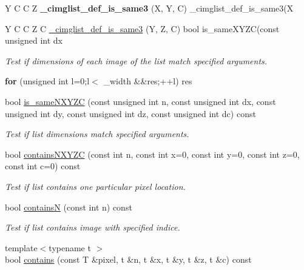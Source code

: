 \begin{DoxyCompactItemize}
Y C C Z {\bfseries \+\_\+cimglist\+\_\+def\+\_\+is\+\_\+same3} (X, Y, C) \+\_\+cimglist\+\_\+def\+\_\+is\+\_\+same3(X
\item 
Y C C Z C \hyperlink{structcimg__library__suffixed_1_1CImgList_af0433cdef08d554b33c9a541cebd8593}{\+\_\+cimglist\+\_\+def\+\_\+is\+\_\+same3} (Y, Z, C) bool is\+\_\+same\+X\+Y\+ZC(const unsigned int dx
\begin{DoxyCompactList}\small\item\em Test if dimensions of each image of the list match specified arguments. \end{DoxyCompactList}\item 
\mbox{\label{structcimg__library__suffixed_1_1CImgList_a2cbfeb29ed7f55c684d5a08d1098f417}} 
{\bfseries for} (unsigned int l=0;l$<$ \+\_\+width \&\&res;++l) res
\item 
bool \hyperlink{structcimg__library__suffixed_1_1CImgList_a3703de66442f8e8ccfc83962e0e09d00}{is\+\_\+same\+N\+X\+Y\+ZC} (const unsigned int n, const unsigned int dx, const unsigned int dy, const unsigned int dz, const unsigned int dc) const
\begin{DoxyCompactList}\small\item\em Test if list dimensions match specified arguments. \end{DoxyCompactList}\item 
bool \hyperlink{structcimg__library__suffixed_1_1CImgList_ad2488203cbf2fddba82666454ea7c90b}{contains\+N\+X\+Y\+ZC} (const int n, const int x=0, const int y=0, const int z=0, const int c=0) const
\begin{DoxyCompactList}\small\item\em Test if list contains one particular pixel location. \end{DoxyCompactList}\item 
bool \hyperlink{structcimg__library__suffixed_1_1CImgList_a717c63e31009dea3c28a2f905434bf1e}{containsN} (const int n) const
\begin{DoxyCompactList}\small\item\em Test if list contains image with specified indice. \end{DoxyCompactList}\item 
{\footnotesize template$<$typename t $>$ }\\bool \hyperlink{structcimg__library__suffixed_1_1CImgList_ab8eb768b6d541a9daff4fee1c6eac8f1}{contains} (const T \&pixel, t \&n, t \&x, t \&y, t \&z, t \&c) const

\end{DoxyCompactItemize}
